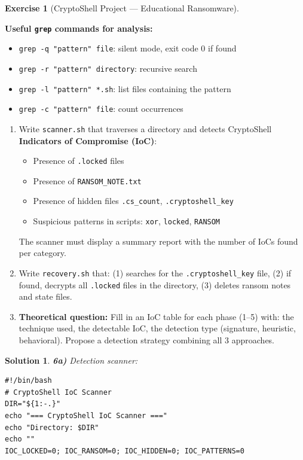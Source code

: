 \documentclass[a4paper,11pt]{article}
\theoremstyle{plain}
\newtheorem{correction}{Solution}
\theoremstyle{definition}
\newtheorem{exercice}{Exercise}
\begin{document}
\begin{exercice}[CryptoShell Project --- Educational Ransomware]
\begin{rappel}
\medskip
\textbf{Useful \texttt{grep} commands for analysis:}
\begin{itemize}
    \item \texttt{grep -q "pattern" file}: silent mode, exit code 0 if found
    \item \texttt{grep -r "pattern" directory}: recursive search
    \item \texttt{grep -l "pattern" *.sh}: list files containing the pattern
    \item \texttt{grep -c "pattern" file}: count occurrences
\end{itemize}
\end{rappel}

\begin{enumerate}
\item[\textbf{6a)}] Write \texttt{scanner.sh} that traverses a directory and detects CryptoShell \textbf{Indicators of Compromise (IoC)}:
\begin{itemize}
    \item Presence of \texttt{.locked} files
    \item Presence of \texttt{RANSOM\_NOTE.txt}
    \item Presence of hidden files \texttt{.cs\_count}, \texttt{.cryptoshell\_key}
    \item Suspicious patterns in scripts: \texttt{xor}, \texttt{locked}, \texttt{RANSOM}
\end{itemize}
The scanner must display a summary report with the number of IoCs found per category.

\item[\textbf{6b)}] Write \texttt{recovery.sh} that: (1) searches for the \texttt{.cryptoshell\_key} file, (2) if found, decrypts all \texttt{.locked} files in the directory, (3) deletes ransom notes and state files.

\item[\textbf{6c)}] \textbf{Theoretical question:} Fill in an IoC table for each phase (1--5) with: the technique used, the detectable IoC, the detection type (signature, heuristic, behavioral). Propose a detection strategy combining all 3 approaches.
\end{enumerate}

\begin{correction}

\textbf{6a)} Detection scanner:
\begin{lstlisting}[title=scanner.sh (phase6\_scanner.sh)]
#!/bin/bash
# CryptoShell IoC Scanner
DIR="${1:-.}"
echo "=== CryptoShell IoC Scanner ==="
echo "Directory: $DIR"
echo ""
IOC_LOCKED=0; IOC_RANSOM=0; IOC_HIDDEN=0; IOC_PATTERNS=0


\end{lstlisting}
\end{correction}
\end{exercice}
\end{document}
